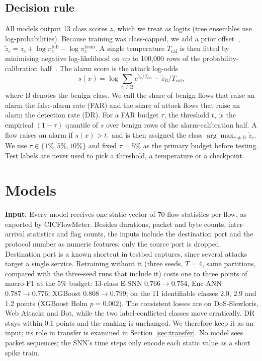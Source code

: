 \documentclass[conference]{IEEEtran}
\begin{document}
\subsection{Decision rule}

All models output 13 class scores $z$, which we treat as logits (tree ensembles use log-probabilities). Because training was class-capped, we add a prior offset~\cite{saerens2002}, $\tilde z_c = z_c + \log \pi_c^{\mathrm{full}} - \log \pi_c^{\mathrm{train}}$. A single temperature $T_\mathrm{cal}$ is then fitted by minimising negative log-likelihood on up to 100{,}000 rows of the probability-calibration half~\cite{guo2017}. The alarm score is the attack log-odds
\begin{equation}
s(x) = \log \sum_{c \neq \mathrm{B}} e^{\tilde z_c/T_\mathrm{cal}} - \tilde z_\mathrm{B}/T_\mathrm{cal},
\end{equation}
where B denotes the benign class. We call the share of benign flows that raise an alarm the false-alarm rate (FAR) and the share of attack flows that raise an alarm the detection rate (DR). For a FAR budget $\tau$, the threshold $t_\tau$ is the empirical $(1-\tau)$ quantile of $s$ over benign rows of the alarm-calibration half. A flow raises an alarm if $s(x) > t_\tau$ and is then assigned the class $\arg\max_{c \neq \mathrm{B}} \tilde z_c$. We use $\tau \in \{1\%, 5\%, 10\%\}$ and fixed $\tau = 5\%$ as the primary budget before testing. Test labels are never used to pick a threshold, a temperature or a checkpoint.

\section{Models}

\textbf{Input.} Every model receives one static vector of 70 flow statistics per flow, as exported by CICFlowMeter. Besides durations, packet and byte counts, inter-arrival statistics and flag counts, the inputs include the destination port and the protocol number as numeric features; only the source port is dropped. Destination port is a known shortcut in testbed captures, since several attacks target a single service. Retraining without it (three seeds, $T = 4$, same partitions, compared with the three-seed runs that include it) costs one to three points of macro-F1 at the 5\% budget: 13-class E-SNN $0.766 \to 0.754$, Enc-ANN $0.787 \to 0.776$, XGBoost $0.808 \to 0.799$; on the 11 identifiable classes 2.0, 2.9 and 1.2 points (XGBoost Holm $p = 0.002$). The consistent losses are on DoS-Slowloris, Web Attacks and Bot, while the two label-conflicted classes move erratically. DR stays within 0.1 points and the ranking is unchanged. We therefore keep it as an input; its role in transfer is examined in Section~\ref{sec:transfer}. No model sees packet sequences; the SNN's time steps only encode each static value as a short spike train.
\end{document}
